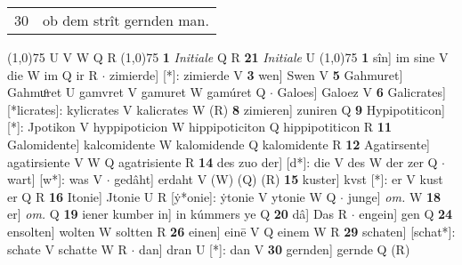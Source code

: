 \documentclass[8pt,a4paper,notitlepage]{article}
\begin{document}
\begin{table}[ht]
\begin{minipage}[t]{0.5\linewidth}
\begin{tabular}{rl}
30 & ob dem strît gernden man.\\ 
\end{tabular}
\scriptsize
\line(1,0){75} \newline
U V W Q R \newline
\line(1,0){75} \newline
\textbf{1} \textit{Initiale} Q R  \textbf{21} \textit{Initiale} U  \newline
\line(1,0){75} \newline
\textbf{1} sîn] im sine V die W im Q ir R  $\cdot$ zimierde] [*]: zimierde V \textbf{3} wen] Swen V \textbf{5} Gahmuret] Gahmuͦret U gamvret V gamuret W gamúret Q  $\cdot$ Galoes] Galoez V \textbf{6} Galicrates] [*licrates]: kylicrates V kalicrates W (R) \textbf{8} zimieren] zuniren Q \textbf{9} Hypipotiticon] [*]: Jpotikon V hyppipoticion W hippipoticiton Q hippipotiticon R \textbf{11} Galomidente] kalcomidente W kalomidende Q kalomidente R \textbf{12} Agatirsente] agatirsiente V W Q agatrisiente R \textbf{14} des zuo der] [d*]: die V des W der zer Q  $\cdot$ wart] [w*]: was V  $\cdot$ gedâht] erdaht V (W) (Q) (R) \textbf{15} kuster] kvst [*]: er V kust er Q R \textbf{16} Itonie] Jtonie U R [ẏ*onie]: ẏtonie V ytonie W Q  $\cdot$ junge] \textit{om.} W \textbf{18} er] \textit{om.} Q \textbf{19} iener kumber in] in kúmmers ye Q \textbf{20} dâ] Das R  $\cdot$ engein] gen Q \textbf{24} ensolten] wolten W soltten R \textbf{26} einen] einē V Q einem W R \textbf{29} schaten] [schat*]: schate V schatte W R  $\cdot$ dan] dran U [*]: dan V \textbf{30} gernden] gernde Q (R) \newline
\end{minipage}
\end{table}
\end{document}
